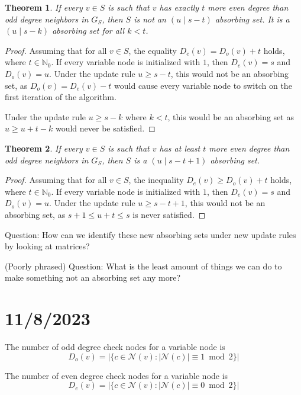 \documentclass{article}
\newtheorem{thm}{Theorem}[section]
\begin{document}
\begin{thm}
    If every $v \in S$ is such that $v$ has \textit{exactly} $t$ more even degree than odd degree neighbors in $G_S$, then $S$ is not an $(u \mid s - t)$ absorbing set. It is a $(u \mid s - k)$ absorbing set for all $k < t$.
\end{thm}
\begin{proof}

    Assuming that for all $v \in S$, the equality $D_e(v) = D_o(v) + t$ holds, where $t \in \mathbb{N}_0$. If every variable node is initialized with $1$, then $D_e(v) = s$ and $D_o(v) = u$. Under the update rule $u \geq s - t$, this would not be an absorbing set, as $D_o(v) = D_e(v) - t$ would cause every variable node to switch on the first iteration of the algorithm.

    Under the update rule $u\geq s-k$ where $k<t$, this would be an absorbing set as $u\geq u+t-k$ would never be satisfied.
\end{proof}


\begin{thm}
    If every $v \in S$ is such that $v$ has at least $t$ more even degree than odd degree neighbors in $G_S$, then $S$ is a $(u \mid s - t + 1)$ absorbing set.
\end{thm}
\begin{proof}
    Assuming that for all $v \in S$, the inequality $D_e(v) \geq D_o(v) + t$ holds, where $t \in \mathbb{N}_0$. If every variable node is initialized with $1$, then $D_e(v) = s$ and $D_o(v) = u$. Under the update rule $u \geq s - t + 1$, this would not be an absorbing set, as $s + 1 \leq u + t \leq s$ is never satisfied.
\end{proof}

Question: How can we identify these new absorbing sets under new update rules by looking at matrices?

(Poorly phrased) Question: What is the least amount of things we can do to make something not an absorbing set any more?

\section*{11/8/2023}

The number of odd degree check nodes for a variable node is $$D_{o}(v)=|\{c\in \mathcal{N}(v):|\mathcal{N}(c)|\equiv{1} \bmod 2\}|$$

The number of even degree check nodes for a variable node is $$D_{e}(v)=|\{c\in \mathcal{N}(v):|\mathcal{N}(c)|\equiv{0} \bmod 2\}|$$
\end{document}
